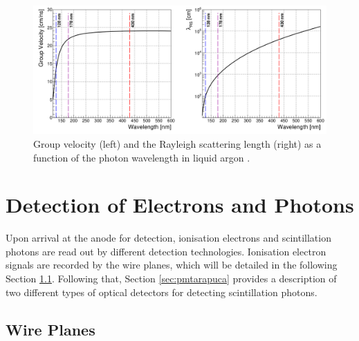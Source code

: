 \begin{figure}[ht!] 
\centering    
\includegraphics[width=1.0\textwidth]{vuv_visible}
\caption[Group Velocity and Rayleigh Scattering Length of Photons in Liquid Argon]{
Group velocity (left) and the Rayleigh scattering length (right) as a function of the photon wavelength in liquid argon \cite{PatrickPhD}.
}
\label{fig:vuv_visible}
\end{figure}

\section{Detection of Electrons and Photons}

\label{sec3:detection}

Upon arrival at the anode for detection, ionisation electrons and scintillation photons are read out by different detection technologies.
Ionisation electron signals are recorded by the wire planes, which will be detailed in the following Section \ref{sec:wire}.
Following that, Section \ref{sec:pmtarapuca} provides a description of two different types of optical detectors for detecting scintillation photons.

\subsection{Wire Planes}
\label{sec:wire}

